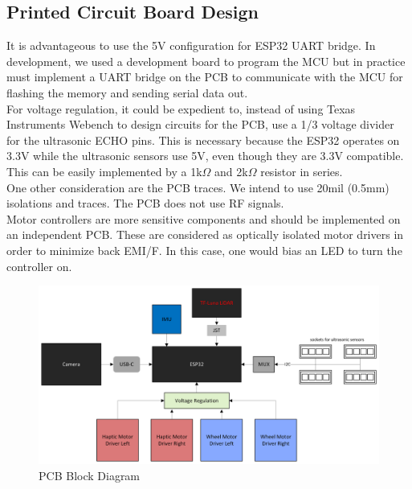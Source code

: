 \subsection{Printed Circuit Board Design} \label{sec:pcb-design}
\noindent It is advantageous to use the 5V configuration for ESP32 UART bridge. In development, we used a development board to program the MCU but in practice must implement a UART bridge on the PCB to communicate with the MCU for flashing the memory and sending serial data out.\\

\noindent For voltage regulation, it could be expedient to, instead of using Texas Instruments Webench to design circuits for the PCB, use a 1/3 voltage divider for the ultrasonic ECHO pins. This is necessary because the ESP32 operates on 3.3V while the ultrasonic sensors use 5V, even though they are 3.3V compatible. This can be easily implemented by a 1k$\Omega$ and 2k$\Omega$ resistor in series.\\

\noindent One other consideration are the PCB traces. We intend to use 20mil (0.5mm) isolations and traces. The PCB does not use RF signals.\\

\noindent Motor controllers are more sensitive components and should be implemented on an independent PCB. These are considered as optically isolated motor drivers in order to minimize back EMI/F. In this case, one would bias an LED to turn the controller on. \cite{l293n}\\

\begin{figure}[H]
	\centering
	\includegraphics[width=\textwidth]{./Images/PCB-Block-Diagram.png}
	\caption{\label{fig:pcb}PCB Block Diagram}
\end{figure}

